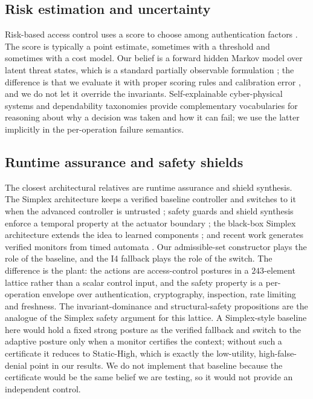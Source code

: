 \subsection{Risk estimation and uncertainty}

Risk-based access control uses a score to choose among authentication factors
\cite{lee2017situational,moura2017sotraace}. The score is typically a point
estimate, sometimes with a threshold and sometimes with a cost model. Our belief
is a forward hidden Markov model \cite{rabiner1989tutorial} over latent threat
states, which is a standard partially observable formulation
\cite{kaelbling1998planning}; the difference is that we evaluate it with proper
scoring rules \cite{gneiting2007strictly} and calibration error
\cite{guo2017calibration}, and we do not let it override the invariants.
Self-explainable cyber-physical systems \cite{blumreiter2019self} and
dependability taxonomies \cite{avizienis2004basic} provide complementary
vocabularies for reasoning about why a decision was taken and how it can fail;
we use the latter implicitly in the per-operation failure semantics.

\subsection{Runtime assurance and safety shields}

The closest architectural relatives are runtime assurance and shield synthesis.
The Simplex architecture keeps a verified baseline controller and switches to it
when the advanced controller is untrusted \cite{sha2001simplicity}; safety guards
and shield synthesis enforce a temporal property at the actuator boundary
\cite{wu2017safety,wu2019shield}; the black-box Simplex architecture extends the
idea to learned components \cite{mehmood2022black}; and recent work generates
verified monitors from timed automata \cite{cho2025timed}. Our admissible-set
constructor plays the role of the baseline, and the I4 fallback plays the role of
the switch. The difference is the plant: the actions are access-control postures
in a $243$-element lattice rather than a scalar control input, and the safety
property is a per-operation envelope over authentication, cryptography,
inspection, rate limiting and freshness. The invariant-dominance and
structural-safety propositions are the analogue of the Simplex safety argument
for this lattice. A Simplex-style baseline here would hold a fixed strong posture
as the verified fallback and switch to the adaptive posture only when a monitor
certifies the context; without such a certificate it reduces to Static-High,
which is exactly the low-utility, high-false-denial point in our results. We do
not implement that baseline because the certificate would be the same belief we
are testing, so it would not provide an independent control.

